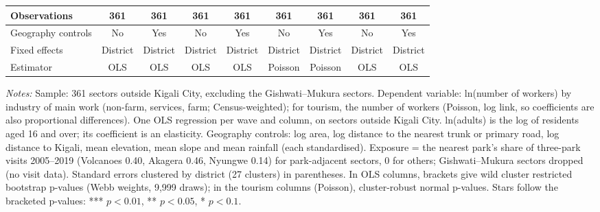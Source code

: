 \documentclass[11pt]{article}
\begin{document}
\begin{table}[H]
{\begin{tabular}{lcccccccc}
Observations & 361 & 361 & 361 & 361 & 361 & 361 & 361 & 361 \\
\midrule
Geography controls & No & Yes & No & Yes & No & Yes & No & Yes \\
Fixed effects & District & District & District & District & District & District & District & District \\
Estimator & OLS & OLS & OLS & OLS & Poisson & Poisson & OLS & OLS \\
\bottomrule
\end{tabular}}
\begin{minipage}{0.97\textwidth}\scriptsize
\textit{Notes:} Sample: 361 sectors outside Kigali City, excluding the Gishwati--Mukura sectors. Dependent variable: ln(number of workers) by industry of main work (non-farm, services, farm; Census-weighted); for tourism, the number of workers (Poisson, log link, so coefficients are also proportional differences). One OLS regression per wave and column, on sectors outside Kigali City. ln(adults) is the log of residents aged 16 and over; its coefficient is an elasticity. Geography controls: log area, log distance to the nearest trunk or primary road, log distance to Kigali, mean elevation, mean slope and mean rainfall (each standardised). Exposure = the nearest park's share of three-park visits 2005--2019 (Volcanoes 0.40, Akagera 0.46, Nyungwe 0.14) for park-adjacent sectors, 0 for others; Gishwati--Mukura sectors dropped (no visit data). Standard errors clustered by district (27 clusters) in parentheses. In OLS columns, brackets give wild cluster restricted bootstrap p-values (Webb weights, 9,999 draws); in the tourism columns (Poisson), cluster-robust normal p-values. Stars follow the bracketed p-values: *** $p<0.01$, ** $p<0.05$, * $p<0.1$.
\end{minipage}
\end{table}
\end{document}
